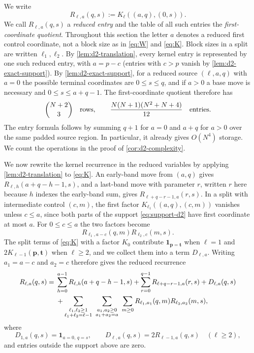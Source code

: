 \documentclass[11pt,reqno]{amsart}
\theoremstyle{definition}
\theoremstyle{remark}
\newcommand{\one}{\mathbf 1}
\begin{document}
We write
\begin{equation}\label{eq:R-definition}
 R_{\ell,a}(q,s):=K_\ell((a,q),(0,s)).
\end{equation}
We call $R_{\ell,a}(q,s)$ a \emph{reduced entry} and the table of all such
entries the \emph{first-coordinate quotient}.  Throughout this section the
letter $a$ denotes a reduced first control coordinate, not a block size as in
\eqref{eq:W} and \eqref{eq:K}.  Block sizes in a split are written
$\ell_1,\ell_2$.  By \cref{lem:d2-translation}, every kernel entry is
represented by one such reduced entry, with $a=p-c$ (entries with $c>p$
vanish by \cref{lem:d2-exact-support}).  By \cref{lem:d2-exact-support}, for a reduced source
$(\ell,a,q)$ with $a=0$ the possible terminal coordinates are
$0\leq s\leq q$, and if $a>0$ a base move is necessary and
$0\leq s\leq a+q-1$.  The first-coordinate quotient therefore has
\begin{equation}\label{eq:d2-first-reduced-counts}
 \binom{N+2}{3}\quad\hbox{rows},
 \qquad
 \frac{N(N+1)(N^2+N+4)}{12}\quad\hbox{entries}.
\end{equation}
The entry formula follows by summing $q+1$ for $a=0$ and $a+q$ for $a>0$
over the same padded source region.  In particular, it already gives
$O(N^4)$ storage.  We count the operations in the proof of
\cref{cor:d2-complexity}.

We now rewrite the kernel recurrence in the reduced variables by applying
\cref{lem:d2-translation} to \eqref{eq:K}.  An early-band move from $(a,q)$
gives $R_{\ell,h}(a+q-h-1,s)$, and a last-band move with parameter $r$,
written $r$ here because $h$ indexes the early-band sum, gives
$R_{\ell+q-r-1,a}(r,s)$.  In a split with intermediate control $(c,m)$,
the first factor $K_{\ell_1}((a,q),(c,m))$ vanishes unless $c\leq a$, since
both parts of the support \eqref{eq:support-d2} have first coordinate at
most $a$.  For $0\leq c\leq a$
the two factors become
\[
 R_{\ell_1,a-c}(q,m)R_{\ell_2,c}(m,s).
\]
The split terms of \eqref{eq:K} with a factor $K_0$ contribute
$\one_{\mathbf p=\mathbf t}$ when $\ell=1$ and $2K_{\ell-1}(\mathbf p,\mathbf t)$
when $\ell\geq2$, and we collect them into a term $D_{\ell,a}$.  Writing
$a_1=a-c$ and $a_2=c$ therefore gives the reduced recurrence
\begin{align}
R_{\ell,a}(q,s)={}&
 \sum_{h=0}^{a-1}R_{\ell,h}(a+q-h-1,s)
 +\sum_{r=0}^{q-1}R_{\ell+q-r-1,a}(r,s)
 +D_{\ell,a}(q,s)                                      \label{eq:R-recurrence}\\
&+\sum_{\substack{\ell_1,\ell_2\geq1\\
                    \ell_1+\ell_2=\ell-1}}
  \ \sum_{\substack{a_1,a_2\geq0\\a_1+a_2=a}}\ \sum_{m\geq0}
  R_{\ell_1,a_1}(q,m)R_{\ell_2,a_2}(m,s),             \notag
\end{align}
where
\[
 D_{1,a}(q,s)=\one_{a=0,\,q=s},
 \qquad
 D_{\ell,a}(q,s)=2R_{\ell-1,a}(q,s)\quad(\ell\geq2),
\]
and entries outside the support above are zero.
\end{document}
